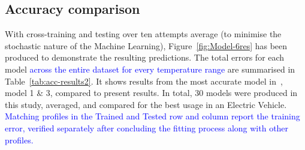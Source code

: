 \subsection{Accuracy comparison}
With cross-training and testing over ten attempts average (to minimise the stochastic nature of the Machine Learning), Figure~\ref{fig:Model-6res} has been produced to demonstrate the resulting predictions.
The total errors for each model \textcolor{blue}{across the entire dataset for every temperature range} are summarised in Table~\ref{tab:acc-results2}.
It shows results from the most accurate model in~\cite{sadykov_practical_2022}, model 1 \& 3, compared to present results.
In total, 30 models were produced in this study, averaged, and compared for the best usage in an Electric Vehicle.
\textcolor{blue}{Matching profiles in the Trained and Tested row and column report the training error, verified separately after concluding the fitting process along with other profiles.}
